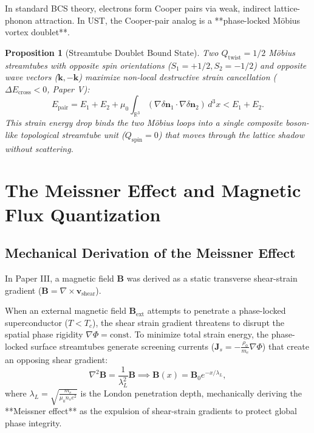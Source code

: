 \documentclass[11pt,a4paper]{article}
\newtheorem{prop}{Proposition}
\begin{document}
	In standard BCS theory, electrons form Cooper pairs via weak, indirect lattice-phonon attraction. In UST, the Cooper-pair analog is a **phase-locked Möbius vortex doublet**.
	
	\begin{prop}[Streamtube Doublet Bound State]
		\label{prop:cooper_streamtube_doublet}
		Two $Q_{\text{twist}} = 1/2$ Möbius streamtubes with opposite spin orientations ($S_1 = +1/2, S_2 = -1/2$) and opposite wave vectors ($\mathbf{k}, -\mathbf{k}$) maximize non-local destructive strain cancellation ($\Delta E_{\text{cross}} < 0$, Paper V):
		\begin{equation}
			E_{\text{pair}} = E_1 + E_2 + \mu_0 \int_{\mathbb{R}^3} (\nabla \delta \mathbf{n}_1 \cdot \nabla \delta \mathbf{n}_2) \, d^3x < E_1 + E_2.
			\label{eq:cooper_pair_strain_reduction}
		\end{equation}
		This strain energy drop binds the two Möbius loops into a single composite boson-like topological streamtube unit ($Q_{\text{spin}} = 0$) that moves through the lattice shadow without scattering.
	\end{prop}
	
	\section{The Meissner Effect and Magnetic Flux Quantization}
	\label{sec:meissner_flux_quantization}
	
	\subsection{Mechanical Derivation of the Meissner Effect}
	In Paper III, a magnetic field $\mathbf{B}$ was derived as a static transverse shear-strain gradient ($\mathbf{B} = \nabla \times \mathbf{v}_{\text{shear}}$).
	
	When an external magnetic field $\mathbf{B}_{\text{ext}}$ attempts to penetrate a phase-locked superconductor ($T < T_c$), the shear strain gradient threatens to disrupt the spatial phase rigidity $\nabla \Phi = \text{const}$. To minimize total strain energy, the phase-locked surface streamtubes generate screening currents ($\mathbf{J}_s = -\frac{\rho_0}{m_e} \nabla \Phi$) that create an opposing shear gradient:
	\begin{equation}
		\nabla^2 \mathbf{B} = \frac{1}{\lambda_L^2} \mathbf{B} \implies \mathbf{B}(x) = \mathbf{B}_0 e^{-x/\lambda_L},
		\label{eq:london_penetration_equation}
	\end{equation}
	where $\lambda_L = \sqrt{\frac{m_e}{\mu_0 n_s e^2}}$ is the London penetration depth, mechanically deriving the **Meissner effect** as the expulsion of shear-strain gradients to protect global phase integrity.
	
\end{document}
